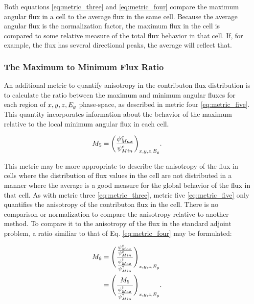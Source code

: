 Both equations \ref{eq:metric_three} and \ref{eq:metric_four} compare the maximum
angular flux in a cell to the average flux in the same cell. Because the average
angular flux is the normalization factor, the maximum flux in the cell is
compared to some relative measure of the total flux behavior in that cell. If,
for example, the flux has several directional peaks, the average will reflect
that.

\subsubsection{The Maximum to Minimum Flux Ratio}

An additional metric to quantify anisotropy in the contributon flux distribution
is to calculate the ratio between the maximum and minimum angular fluxes for
each region of $x,y,z,E_g$ phase-space, as described in metric
four \ref{eq:metric_five}. This
quantity incorporates information about the
behavior of the maximum relative to the local minimum angular flux in each cell.

\begin{equation}
  M_{5} = \bigg(\frac{\psi^{c}_{Max}}{\psi^{c}_{
          Min}}\bigg)_{x,y,z,E_g}  .
  \label{eq:metric_five}
\end{equation}

This metric may be more appropriate to describe the anisotropy of the flux in
cells where the distribution of flux values in the cell are not distributed in a
manner where the average is a good measure for the global behavior of the flux
in that cell. As with metric three \eqref{eq:metric_three}, metric five
\eqref{eq:metric_five} only quantifies
the anisotropy of the contributon flux in the cell. There is no comparison or
normalization to compare the anisotropy relative to another method. To
compare it to the anisotropy of the flux in the standard adjoint
problem, a ratio similiar to that of Eq. \ref{eq:metric_four} may be
formulated:

\begin{equation}
  \begin{split}
    M_{6} & = \Bigg( \frac{\frac{\psi^{c}_{Max}}{\psi^{c}_{
                  Min}}}{\frac{\psi^{\dagger}_{
                  Max}}{\psi^{\dagger}_{Min}}} \Bigg)_{x,y,z,E_g} \\
          & = \Bigg(\frac{M_{5}}{\frac{\psi^{\dagger}_{Max}}
                  {\psi^{\dagger}_{Min}}} \Bigg)_{x,y,z,E_g}  .
  \end{split}
  \label{eq:metric_six}
\end{equation}

